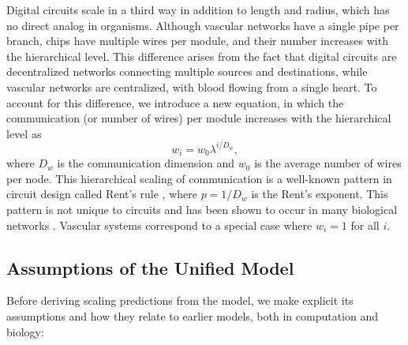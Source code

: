 \documentclass[12pt]{article}
\begin{document}
Digital circuits scale in a third way in addition to length and
radius, which has no direct 
analog in organisms. Although vascular networks have a single pipe per 
branch, chips have multiple wires per module, and their number 
increases with the hierarchical level. This difference arises from the 
fact that digital circuits are decentralized networks connecting 
multiple sources and destinations, while vascular networks are 
centralized, with blood flowing from a single heart. To account for 
this difference, we introduce a new equation, in which the 
communication (or number of wires) per module increases with the 
hierarchical level as
\begin{equation}
w_i = w_0 \lambda^{i/D_w},
\label{eq:communication}
\end{equation}
where $D_w$ is the communication dimension and $w_0$ is the average 
number of wires per node.  This hierarchical scaling of communication 
is a well-known pattern in circuit design called Rent's rule 
\cite{christie00}, where $p = 1/D_w$ is the Rent's exponent. This 
pattern is not unique to circuits and has been shown to occur in many 
biological networks \cite{reda09,bassett10}.   Vascular systems 
correspond to a special case where 
$w_i = 1$ for all $i$. 

\subsection{Assumptions of the Unified Model}
\label{assumptions}

Before deriving scaling predictions from the model, we make explicit
its  assumptions and how they relate to earlier models, both in
computation and biology:
\end{document}
